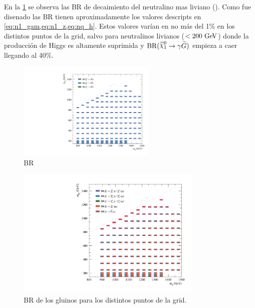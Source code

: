 En la \cref{fig:signal_br_n1} se observa las BR de decaimiento del
neutralino mas liviano (\ninoone). Como fue disenado las BR tienen aproximadamente
los valores descripts en \cref{eq:n1_gam,eq:n1_z,eq:nq_h}.
Estos valores varían en no más del 1\% en los distintos puntos de la grid, salvo para neutralinos
livianos ($<200\gev$) donde la producción de Higgs es altamente suprimida y
$\mathrm{BR}(\ninoone \to \gam \gravino)$ empieza a caer llegando al 40\%.

\begin{figure}[!htbp]
  \centering

  \includegraphics[width=0.6\textwidth]{figures/br_n1_X}

  \caption{BR}
  \label{fig:signal_br_n1}
\end{figure}




\begin{figure}[h]
  \centering
  \includegraphics[width=0.8\textwidth]{figures/br_gl_X}
  \caption{BR de los gluinos para los distintos puntos de la grid.}
\end{figure}


